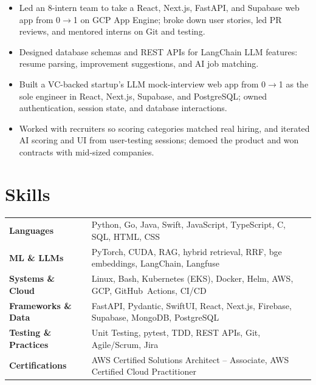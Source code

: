 \documentclass[11pt, letterpaper]{article}
\begin{document}
\vspace{1pt}
\begin{itemize}
  \item Led an 8-intern team to take a React, Next.js, FastAPI, and Supabase web app from 0$\to$1 on GCP App Engine; broke down user stories, led PR reviews, and mentored interns on Git and testing.
  \item Designed database schemas and REST APIs for LangChain LLM features: resume parsing, improvement suggestions, and AI job matching.
\end{itemize}

\vspace{1pt}
\begin{itemize}
  \item Built a VC-backed startup's LLM mock-interview web app from 0$\to$1 as the sole engineer in React, Next.js, Supabase, and PostgreSQL; owned authentication, session state, and database interactions.
  \item Worked with recruiters so scoring categories matched real hiring, and iterated AI scoring and UI from user-testing sessions; demoed the product and won contracts with mid-sized companies.
\end{itemize}

\section{Skills}
\begin{tabularx}{\textwidth}{@{}l @{\hspace{7pt}} >{\raggedright\arraybackslash}X@{}}
  \textbf{Languages} & Python, Go, Java, Swift, JavaScript, TypeScript, C, SQL, HTML, CSS \\[1pt]
  \textbf{ML \& LLMs} & PyTorch, CUDA, RAG, hybrid retrieval, RRF, bge embeddings, LangChain, Langfuse \\[1pt]
  \textbf{Systems \& Cloud} & Linux, Bash, Kubernetes (EKS), Docker, Helm, AWS, GCP, GitHub~Actions, CI/CD \\[1pt]
  \textbf{Frameworks \& Data} & FastAPI, Pydantic, SwiftUI, React, Next.js, Firebase, Supabase, MongoDB, PostgreSQL \\[1pt]
  \textbf{Testing \& Practices} & Unit Testing, pytest, TDD, REST APIs, Git, Agile/Scrum, Jira \\[1pt]
  \textbf{Certifications} & AWS Certified Solutions Architect -- Associate, AWS Certified Cloud Practitioner \\
\end{tabularx}
\end{document}
